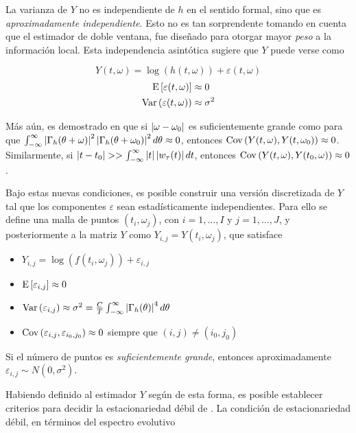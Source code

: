 La varianza de $Y$ no es independiente de $h$ en el sentido formal, sino que es 
\textit{aproximadamente independiente}.
Esto no es tan sorprendente tomando en cuenta que el estimador de doble ventana, fue diseñado para 
otorgar mayor \textit{peso} a la información local. Esta independencia asintótica sugiere que $Y$ 
puede verse como

\begin{equation}
Y(t,\omega) = \log\left(h(t,\omega) \right) + \varepsilon(t,\omega)
\end{equation}
\begin{align*}
\mathrm{E}\left[ \varepsilon(t,\omega) \right] &\approx 0 \\
\mathrm{Var}\left( \varepsilon(t,\omega) \right) &\approx \sigma^{2}
\end{align*}

Más aún, es demostrado en \cite{Priestley66} que si $\left| \omega-\omega_0 \right|$ es suficientemente 
grande como para que 
$\int_{-\infty}^{\infty} \left| \Gamma_h(\theta+\omega) \right|^{2}\left| \Gamma_h(\theta+\omega_0) \right|^{2} d\theta \approx 0$,
entonces 
$\mathrm{Cov}\left( Y(t,\omega),Y(t,\omega_0) \right) \approx 0$.
Similarmente, si $\left| t-t_0 \right| >> \int_{-\infty}^{\infty} \left| t \right| \left| w_\tau (t) \right| dt $, entonces
$\mathrm{Cov}\left( Y(t,\omega),Y(t_0,\omega) \right) \approx 0$.

Bajo estas nuevas condiciones, es posible construir una versión discretizada de $Y$ tal que los 
componentes $\varepsilon$ sean estadísticamente independientes. Para ello se define una malla de 
puntos $(t_i,\omega_j)$, con $i = 1,\dots,I$ y  $j=1,\dots,J$, y posteriormente a la matriz $Y$ 
como $Y_{i,j} = Y(t_i,\omega_j)$, que satisface
%
\begin{itemize}
\item $Y_{i,j} = \log\left(f(t_i,\omega_j)\right) + \varepsilon_{i,j}$
\item $\mathrm{E}\left[ \varepsilon_{i,j} \right] \approx 0$
\item $\mathrm{Var}\left( \varepsilon_{i,j} \right) \approx \sigma^{2} = 
\frac{C}{T} \int_{-\infty}^{\infty} \left| \Gamma_h(\theta) \right|^{4} d\theta$
\item $\mathrm{Cov}\left( \varepsilon_{i,j},\varepsilon_{i_0,j_0} \right) \approx 0$ siempre que $(i,j)\neq (i_0,j_0)$
\end{itemize}

Si el número de puntos es \textit{suficientemente grande}, entonces aproximadamente
$\varepsilon_{i,j} \sim N(0,\sigma^{2})$.

Habiendo definido al estimador $Y$ según de esta forma, es posible establecer criterios para
decidir la estacionariedad débil de \xt.
%
La condición de estacionariedad débil, en términos del espectro evolutivo 



